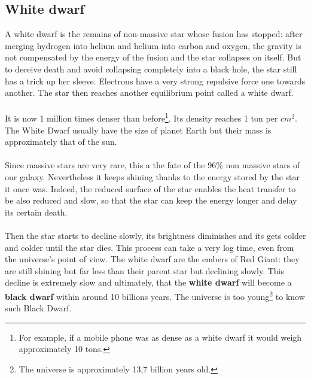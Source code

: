 \documentclass[a4paper, 11pt]{article} %
\begin{document}
\subsection{White dwarf}
\label{whiteDwarf}
A white dwarf is the remains of non-massive star whose fusion has stopped: after merging hydrogen into helium and helium into carbon and oxygen, the gravity is not compensated by the energy of the fusion and the star collapses on itself. But to deceive death and avoid collapsing completely into a black hole, the star still has a trick up her sleeve. Electrons have a very strong repulsive force one towards another. The star then reaches another equilibrium point called a white dwarf.


\paragraph*{}
 It is now 1 million times denser than before\footnote{For example, if a mobile phone was as dense as a white dwarf it would weigh approximately 10 tons.}. Its density reaches 1 ton per $cm^2$. The White Dwarf usually have the size of planet Earth but their mass is approximately that of the sun.

\paragraph*{}

Since massive stars are very rare, this a the fate of the $96\%$ non massive stars of our galaxy. 
Nevertheless it keeps shining thanks to the energy stored by the star it once was. Indeed, the reduced surface of the star enables the heat transfer to be also reduced and slow, so that the star can keep the energy longer and delay its certain death.
\paragraph*{}

Then the star starts to decline slowly, its brightness diminishes and its gets colder and colder until the star dies. This process can take a very log time, even from the universe's point of view. 
The white dwarf are the embers of Red Giant: they are still shining but far less than their parent star but declining slowly.
This decline is extremely slow and ultimately, that the \textbf{white dwarf} will become a \textbf{black dwarf} within around 10 billions years. The universe is too young\footnote{The universe is approximately 13,7 billion years old.} to know such Black Dwarf. 
\end{document}

